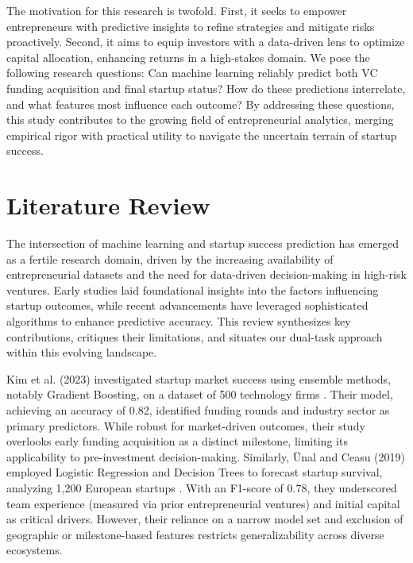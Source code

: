 \documentclass[conference]{IEEEtran}
\begin{document}
    The motivation for this research is twofold. First, it seeks to empower entrepreneurs with predictive insights to refine strategies and mitigate risks proactively. Second, it aims to equip investors with a data-driven lens to optimize capital allocation, enhancing returns in a high-stakes domain. We pose the following research questions: Can machine learning reliably predict both VC funding acquisition and final startup status? How do these predictions interrelate, and what features most influence each outcome? By addressing these questions, this study contributes to the growing field of entrepreneurial analytics, merging empirical rigor with practical utility to navigate the uncertain terrain of startup success.

\section{Literature Review}
    The intersection of machine learning and startup success prediction has emerged as a fertile research domain, driven by the increasing availability of entrepreneurial datasets and the need for data-driven decision-making in high-risk ventures. Early studies laid foundational insights into the factors influencing startup outcomes, while recent advancements have leveraged sophisticated algorithms to enhance predictive accuracy. This review synthesizes key contributions, critiques their limitations, and situates our dual-task approach within this evolving landscape.

    Kim et al. (2023) investigated startup market success using ensemble methods, notably Gradient Boosting, on a dataset of 500 technology firms \cite{sciencedirect}. Their model, achieving an accuracy of 0.82, identified funding rounds and industry sector as primary predictors. While robust for market-driven outcomes, their study overlooks early funding acquisition as a distinct milestone, limiting its applicability to pre-investment decision-making. Similarly, Ünal and Ceasu (2019) employed Logistic Regression and Decision Trees to forecast startup survival, analyzing 1,200 European startups \cite{econstar}. With an F1-score of 0.78, they underscored team experience (measured via prior entrepreneurial ventures) and initial capital as critical drivers. However, their reliance on a narrow model set and exclusion of geographic or milestone-based features restricts generalizability across diverse ecosystems.
\end{document}
